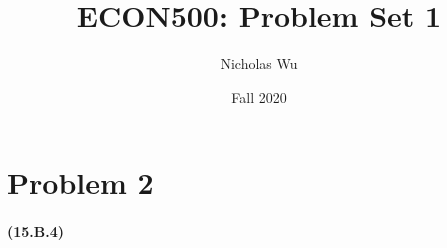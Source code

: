 \documentclass[10pt,letter]{article}
\begin{document}


\title{ECON500: Problem Set 1}

\author{Nicholas Wu}

\date{Fall 2020}

\maketitle


\section*{Problem 2}
\paragraph{(15.B.4)}
\end{document}
